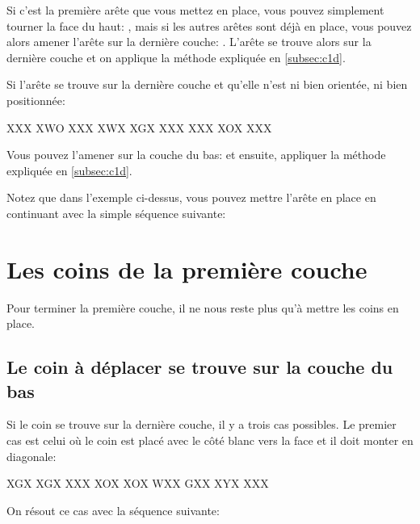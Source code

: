 Si c'est la première arête que vous mettez en place, vous pouvez simplement tourner la face du haut: , mais si les autres arêtes sont déjà en place, vous pouvez alors amener l'arête sur la dernière couche: . L'arête se trouve alors sur la dernière couche et on applique la méthode expliquée en \ref{subsec:c1d}.

Si l'arête se trouve sur la dernière couche et qu'elle n'est ni bien orientée, ni bien positionnée:

\begin{center}
	\RubikFaceUp%
	{X}{X}{X}%
	{X}{W}{O}%
	{X}{X}{X}
	\RubikFaceRight%
	{X}{W}{X}%
	{X}{G}{X}%
	{X}{X}{X}
	\RubikFaceFront%
	{X}{X}{X}%
	{X}{O}{X}%
	{X}{X}{X}
\end{center}

Vous pouvez l'amener sur la couche du bas:  et ensuite, appliquer la méthode expliquée en \ref{subsec:c1d}.

Notez que dans l'exemple ci-dessus, vous pouvez mettre l'arête en place en continuant avec la simple séquence suivante: 

\section{Les coins de la première couche}

Pour terminer la première couche, il ne nous reste plus qu'à mettre les coins en place.

\subsection{Le coin à déplacer se trouve sur la couche du bas}
\label{subsec:c1cd}

Si le coin se trouve sur la dernière couche, il y a trois cas possibles.
Le premier cas est celui où le coin est placé avec le côté blanc vers
la face et il doit monter en diagonale: 

\begin{center}  	
	\RubikFaceRight%
	{X}{G}{X}%
	{X}{G}{X}%
	{X}{X}{X}
	\RubikFaceFront%
	{X}{O}{X}%
	{X}{O}{X}%
	{W}{X}{X}
	\RubikFaceDown%
	{G}{X}{X}%
	{X}{Y}{X}%
	{X}{X}{X}
	
\end{center} 

On résout ce cas avec la séquence suivante:

